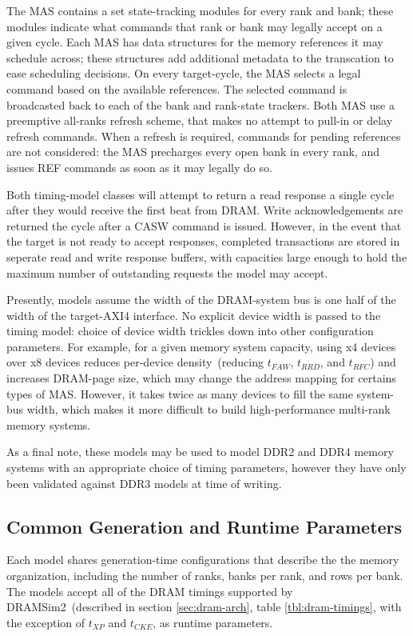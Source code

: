 The MAS contains a set state-tracking modules for every rank and bank; these
modules indicate what commands that rank or bank may legally accept on a given
cycle. Each MAS has data structures for the memory references it may schedule
across; these structures add additional metadata to the transcation to ease
scheduling decisions. On every target-cycle, the MAS selects a legal command
based on the available references. The selected command is broadcasted back to
each of the bank and rank-state trackers.  Both MAS use a preemptive all-ranks
refresh scheme, that makes no attempt to pull-in or delay refresh commands.
When a refresh is required, commands for pending references are not considered:
the MAS precharges every open bank in every rank, and issues REF commands as
soon as it may legally do so.

Both timing-model classes will attempt to return a read response a single cycle
after they would receive the first beat from DRAM. Write acknowledgements are
returned the cycle after a CASW command is issued. However, in the event that
the target is not ready to accept responses, completed transactions are stored
in seperate read and write response buffers, with capacities large enough to
hold the maximum number of outstanding requests the model may accept.

Presently, models assume the width of the DRAM-system bus is one half of the width of the
target-AXI4 interface. No explicit device width is passed to the timing
model: choice of device width trickles down into other configuration
parameters. For example, for a given memory system capacity, using x4 devices
over x8 devices reduces per-device density~(reducing $t_{FAW}$,
$t_{RRD}$, and $t_{RFC}$) and increases DRAM-page size, which may change the
address mapping for certains types of MAS.  However, it takes twice as many
devices to fill the same system-bus width, which makes it more difficult to
build high-performance multi-rank memory systems.

As a final note, these models may be used to model DDR2 and DDR4 memory systems with an
appropriate choice of timing parameters, however they have only been validated
against DDR3 models at time of writing.

\subsection{Common Generation and Runtime Parameters}

Each model shares generation-time configurations that describe the
the memory organization, including the number of ranks,
banks per rank, and rows per bank. The models accept all of the DRAM timings supported by DRAMSim2~(described in
section \ref{sec:dram-arch}, table \ref{tbl:dram-timings}, with the exception
of $t_{XP}$ and $t_{CKE}$, as runtime parameters.


